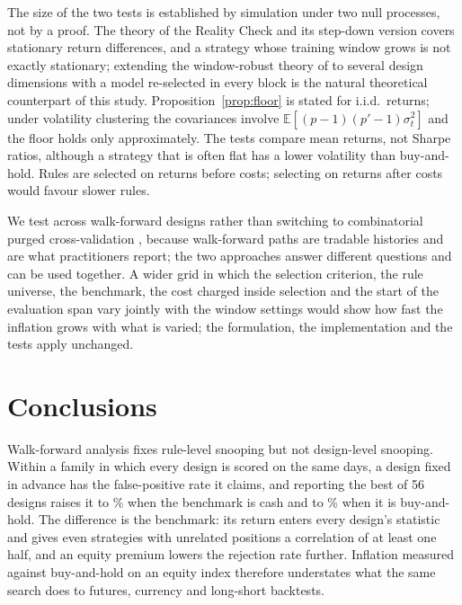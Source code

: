 \documentclass[pdflatex,sn-basic]{sn-jnl}
\theoremstyle{thmstyleone}
\theoremstyle{thmstylethree}
\newcommand{\E}{\mathbb{E}}
\begin{document}
The size of the two tests is established by simulation under two null processes, not by a proof.
The theory of the Reality Check and its step-down version \citep{white2000,romano2005} covers
stationary return differences, and a strategy whose training window grows is not exactly stationary;
extending the window-robust theory of \citet{rossi2012} to several design dimensions with a model
re-selected in every block is the natural theoretical counterpart of this study. Proposition~\ref{prop:floor}
is stated for i.i.d.\ returns; under volatility clustering the covariances involve
$\E[(p-1)(p'-1)\sigma^2_t]$ and the floor holds only approximately. The tests compare mean returns,
not Sharpe ratios, although a strategy that is often flat has a lower volatility than buy-and-hold.
Rules are selected on returns before costs; selecting on returns after costs would favour slower rules.

We test across walk-forward designs rather than switching to combinatorial purged cross-validation
\citep{lopezdeprado2018,arian2024}, because walk-forward paths are tradable histories and are what
practitioners report; the two approaches answer different questions and can be used together. A wider
grid in which the selection criterion, the rule universe, the benchmark, the cost charged inside
selection and the start of the evaluation span vary jointly with the window settings would show how
fast the inflation grows with what is varied; the formulation, the implementation and the tests apply
unchanged.

\section{Conclusions}\label{sec:conclusion}

Walk-forward analysis fixes rule-level snooping but not design-level snooping. Within a family in which
every design is scored on the same days, a design fixed in advance has the false-positive rate it claims,
and reporting the best of 56 designs raises it to \NumSizeBestNaiveCash\% when the benchmark is cash and
to \NumSizeBestNaive\% when it is buy-and-hold. The difference is the benchmark: its return enters
every design's statistic and gives even strategies with unrelated positions a correlation of at
least one half, and an equity premium lowers the rejection rate further. Inflation measured against buy-and-hold on an equity
index therefore understates what the same search does to futures, currency and long-short backtests.
\end{document}
